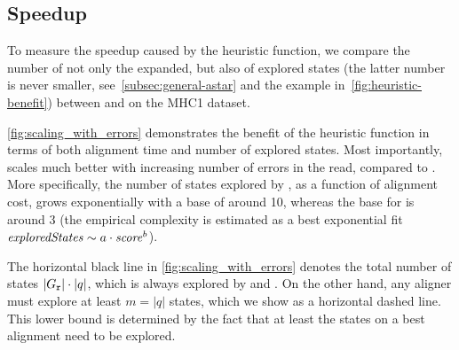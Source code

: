\subsection{\A Speedup}
To measure the speedup caused by the heuristic function, we compare the number
of not only the expanded, but also of explored states (the latter number is
never smaller, see~\cref{subsec:general-astar} and the example
in~\cref{fig:heuristic-benefit}) between \astarix and \dijkstra on the MHC1
dataset.

\cref{fig:scaling_with_errors} demonstrates the benefit of the heuristic
function in terms of both alignment time and number of explored states. Most
importantly, \astarix scales much better with increasing number of errors in the
read, compared to \dijkstra. More specifically, the number of states explored by
\dijkstra, as a function of alignment cost, grows exponentially with a base of 
around 10, whereas the base for \astarix is around 3 (the empirical complexity is
estimated as a best exponential fit \mbox{$\mathit{exploredStates} \sim a \cdot
\mathit{score}^b$}).

The horizontal black line in \cref{fig:scaling_with_errors} denotes the total
number of states $\lvert G_\texttt{r} \rvert \cdot \lvert q \rvert$, which is always
explored by \bitparallel and \pasgal. On the other hand, any aligner must
explore at least $m = \lvert q \rvert$ states, which we show as a horizontal
dashed line. This lower bound is determined by the fact that at least the states
on a best alignment need to be explored.

